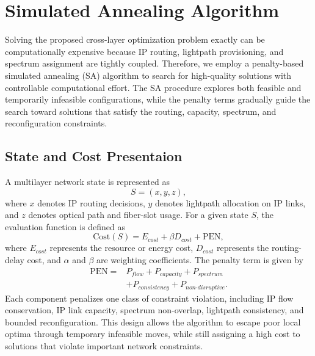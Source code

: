\documentclass[conference]{IEEEtran}
\begin{document}
\section{Simulated Annealing Algorithm}
\label{sec:sa}

Solving the proposed cross-layer optimization problem exactly can be computationally expensive because IP routing, lightpath provisioning, and spectrum assignment are tightly coupled. Therefore, we employ a penalty-based simulated annealing (SA) algorithm to search for high-quality solutions with controllable computational effort. The SA procedure explores both feasible and temporarily infeasible configurations, while the penalty terms gradually guide the search toward solutions that satisfy the routing, capacity, spectrum, and reconfiguration constraints.

\subsection{State and Cost Presentaion}
A multilayer network state is represented as
\begin{equation}
    S = (x,y,z),
\end{equation}
where $x$ denotes IP routing decisions, $y$ denotes lightpath allocation on IP links, and $z$ denotes optical path and fiber-slot usage. For a given state $S$, the evaluation function is defined as
\begin{equation}
    \mathrm{Cost}(S) =  E_{cost} + \beta D_{cost} + \mathrm{PEN},
    \label{eq:sa-cost}
\end{equation}
where $E_{cost}$ represents the resource or energy cost, $D_{cost}$ represents the routing-delay cost, and $\alpha$ and $\beta$ are weighting coefficients. The penalty term is given by
\begin{equation}
\begin{split}
    \mathrm{PEN} ={}& P_{flow} + P_{capacity} + P_{spectrum} \\
                    &+ P_{consistency} + P_{non\text{-}disruptive}.
\end{split}
\label{eq:penalty}
\end{equation}
Each component penalizes one class of constraint violation, including IP flow conservation, IP link capacity, spectrum non-overlap, lightpath consistency, and bounded reconfiguration. This design allows the algorithm to escape poor local optima through temporary infeasible moves, while still assigning a high cost to solutions that violate important network constraints.
\end{document}
